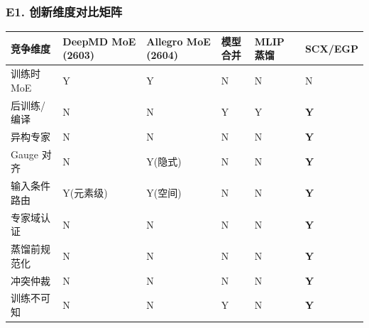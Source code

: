 \documentclass[
  12pt,
]{ctexart}
\begin{document}
\subsubsection{E1.
创新维度对比矩阵}\label{e1.-ux521bux65b0ux7ef4ux5ea6ux5bf9ux6bd4ux77e9ux9635}

\begin{longtable}[]{@{}
  >{\raggedright\arraybackslash}p{}
  >{\centering\arraybackslash}p{}
  >{\centering\arraybackslash}p{}
  >{\centering\arraybackslash}p{}
  >{\centering\arraybackslash}p{}
  >{\centering\arraybackslash}p{}@{}}
\toprule\noalign{}
\begin{minipage}[b]{\linewidth}\raggedright
竞争维度
\end{minipage} & \begin{minipage}[b]{\linewidth}\centering
DeepMD MoE (2603)
\end{minipage} & \begin{minipage}[b]{\linewidth}\centering
Allegro MoE (2604)
\end{minipage} & \begin{minipage}[b]{\linewidth}\centering
模型合并
\end{minipage} & \begin{minipage}[b]{\linewidth}\centering
MLIP 蒸馏
\end{minipage} & \begin{minipage}[b]{\linewidth}\centering
SCX/EGP
\end{minipage} \\
\midrule\noalign{}
\endhead
\bottomrule\noalign{}
\endlastfoot
训练时 MoE & Y & Y & N & N & N \\
后训练/编译 & N & N & Y & Y & \textbf{Y} \\
异构专家 & N & N & N & N & \textbf{Y} \\
Gauge 对齐 & N & Y(隐式) & N & N & \textbf{Y} \\
输入条件路由 & Y(元素级) & Y(空间) & N & N & \textbf{Y} \\
专家域认证 & N & N & N & N & \textbf{Y} \\
蒸馏前规范化 & N & N & N & N & \textbf{Y} \\
冲突仲裁 & N & N & N & N & \textbf{Y} \\
训练不可知 & N & N & Y & N & \textbf{Y} \\
\end{longtable}
\end{document}
